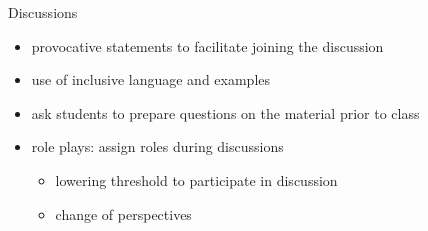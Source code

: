 \begin{frame}{Discussions}
	\begin{itemize}
	\item provocative statements to facilitate joining the discussion
	\item use of inclusive language and examples
	\item ask students to prepare questions on the material prior to class
	
	\item role plays: assign roles during discussions
	\begin{itemize}
		\item lowering threshold to participate in discussion
		\item change of perspectives
	\end{itemize}
	\end{itemize}
\end{frame}




